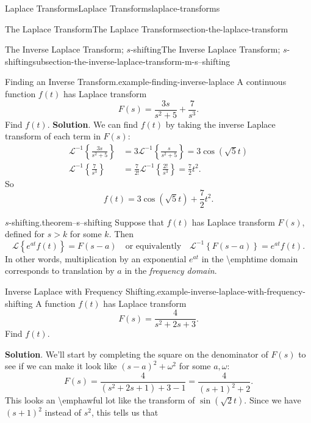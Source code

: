 \documentclass[oneside,10pt,]{book}
\numberwithin{equation}{section}
\newcommand{\Laplace}[1]{\mathcal{L}\left\{#1\right\}}
\newcommand{\iLaplace}[1]{\mathcal{L}^{-1}\left\{#1\right\}}
\newcommand{\qq}[1]{\quad\text{#1}\quad}
\newcommand{\gt}{>}
\newcommand{\amp}{&}
\begin{document}
\begin{chapterptx}{Laplace Transforms}{}{Laplace Transforms}{}{}{laplace-transforms}
\begin{sectionptx}{The Laplace Transform}{}{The Laplace Transform}{}{}{section-the-laplace-transform}
\begin{subsectionptx}{The Inverse Laplace Transform; \(s\)-shifting}{}{The Inverse Laplace Transform; \(s\)-shifting}{}{}{subsection-the-inverse-laplace-transform-m-s--shifting}
\begin{example}{Finding an Inverse Transform.}{example-finding-inverse-laplace}%
\hypertarget{p-508}{}%
A continuous function \(f(t)\) has Laplace transform%
\begin{equation*}
F(s) = \frac{3s}{s^{2}+5} + \frac{7}{s^{3}}.
\end{equation*}
Find \(f(t)\).%
\textbf{Solution}.\quad%
\hypertarget{p-509}{}%
We can find \(f(t)\) by taking the inverse Laplace transform of each term in \(F(s)\):%
\begin{align*}
\iLaplace{\frac{3s}{s^{2}+5}} \amp= 3\iLaplace{\frac{s}{s^{2}+5}} = 3\cos(\sqrt{5}t)\\
\iLaplace{\frac{7}{s^{3}}} \amp= \frac{7}{2!}\iLaplace{\frac{2!}{s^{3}}} = \frac{7}{2}t^{2}\text{.}
\end{align*}
So%
\begin{equation*}
f(t) = 3\cos(\sqrt{5}t)+\frac{7}{2}t^{2}.
\end{equation*}
%
\end{example}
\begin{theorem}{\(s\)-shifting.}{}{theorem--s--shifting}%
\hypertarget{p-510}{}%
Suppose that \(f(t)\) has Laplace transform \(F(s)\), defined for \(s\gt k\) for some \(k\). Then%
\begin{equation*}
\Laplace{e^{at}f(t)} = F(s-a)\qq{or equivalently} \iLaplace{F(s-a)} = e^{at}f(t).
\end{equation*}
In other words, multiplication by an exponential \(e^{at}\) in the \textbackslash{}emph\textbraceleft{}time domain\textbraceright{} corresponds to translation by \(a\) in the \emph{frequency domain}.%
\end{theorem}
\begin{example}{Inverse Laplace with Frequency Shifting.}{example-inverse-laplace-with-frequency-shifting}%
\hypertarget{p-511}{}%
A function \(f(t)\) has Laplace transform%
\begin{equation*}
F(s) = \frac{4}{s^{2}+2s+3}.
\end{equation*}
Find \(f(t)\).%
\par\smallskip%
\noindent\textbf{Solution}.\hypertarget{solution-81}{}\quad%
\hypertarget{p-512}{}%
We'll start by completing the square on the denominator of \(F(s)\) to see if we can make it look like \((s-a)^{2}+\omega^{2}\) for some \(a,\omega\):%
\begin{equation*}
F(s) = \frac{4}{(s^{2}+2s+1)+3-1} = \frac{4}{(s+1)^{2}+2}.
\end{equation*}
This looks an \textbackslash{}emph\textbraceleft{}awful\textbraceright{} lot like the transform of \(\sin(\sqrt{2}t)\). Since we have \((s+1)^{2}\) instead of \(s^{2}\), this tells us that%

\end{example}
\end{subsectionptx}
\end{sectionptx}
\end{chapterptx}
\end{document}
